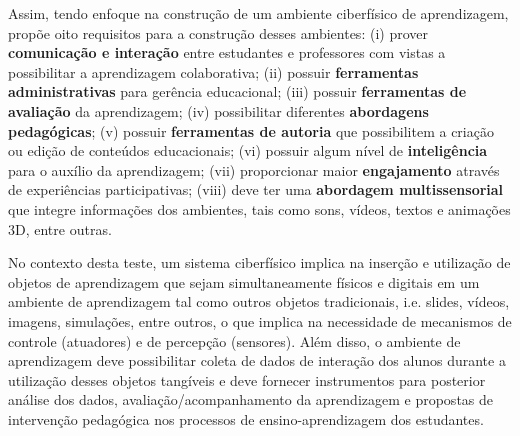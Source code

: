 Assim, tendo enfoque na construção de um ambiente ciberfísico de aprendizagem, \cite{santos:2014ambientes} propõe oito requisitos para a construção desses ambientes: (i) prover \textbf{comunicação e interação} entre estudantes e professores com vistas a possibilitar a aprendizagem colaborativa; (ii) possuir \textbf{ferramentas administrativas} para gerência educacional; (iii) possuir \textbf{ferramentas de avaliação} da aprendizagem; (iv) possibilitar diferentes \textbf{abordagens pedagógicas}; (v) possuir \textbf{ferramentas de autoria} que possibilitem a criação ou edição de conteúdos educacionais; (vi) possuir algum nível de \textbf{inteligência} para o auxílio da aprendizagem; (vii) proporcionar maior \textbf{engajamento} através de experiências participativas; (viii) deve ter uma \textbf{abordagem multissensorial} que integre informações dos ambientes, tais como sons, vídeos, textos e animações 3D, entre outras.

No contexto desta teste, um sistema ciberfísico implica na inserção e utilização de objetos de aprendizagem que sejam simultaneamente físicos e digitais em um ambiente de aprendizagem tal como outros objetos tradicionais, i.e. slides, vídeos, imagens, simulações, entre outros, o que implica na necessidade de mecanismos de controle (atuadores) e de percepção (sensores). Além disso, o ambiente de aprendizagem deve possibilitar coleta de dados de interação dos alunos durante a utilização desses objetos tangíveis e deve fornecer instrumentos para posterior análise dos dados, avaliação/acompanhamento da aprendizagem e propostas de intervenção pedagógica nos processos de ensino-aprendizagem dos estudantes.


	
	

